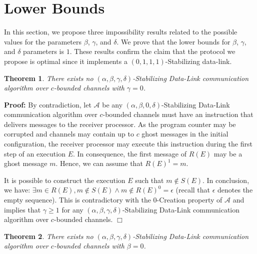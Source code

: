 \documentclass[11pt]{article}
\newtheorem{theorem}{Theorem}
\newenvironment{proof}{\noindent\textbf{Proof:}}{\hfill$\Box$}
\begin{document}
\section{Lower Bounds}\label{sec:impossibility}

In this section, we propose three impossibility results related to the possible values for the parameters $\beta$, $\gamma$, and $\delta$. We prove that the lower bounds for $\beta$, $\gamma$, and $\delta$ parameters is $1$. These results confirm the claim that the protocol we propose is optimal since it implements a $(0,1,1,1)$-Stabilizing data-link.

\begin{theorem}\label{th:impGamma}
There exists no $(\alpha,\beta,\gamma,\delta)$-Stabilizing Data-Link communication algorithm over $c$-bounded channels with $\gamma=0$.
\end{theorem}

\begin{proof}
By contradiction, let $\mathcal{A}$ be any $(\alpha,\beta,0,\delta)$-Stabilizing Data-Link communication algorithm over $c$-bounded channels must have an instruction that delivers messages to the receiver processor. As the program counter may be corrupted and channels may contain up to $c$ ghost messages in the initial configuration, the receiver processor may execute this instruction during the first step of an execution $E$. In consequence, the first message of $R(E)$ may be a ghost message $m$. Hence, we can assume that $R(E)^1=m$.

It is possible to construct the execution $E$ such that $m\notin S(E)$. In conclusion, we have: $\exists m\in R(E), m\notin S(E)\wedge m\notin R(E)^0=\epsilon$ (recall that $\epsilon$ denotes the empty sequence). This is contradictory with the 0-Creation property of $\mathcal{A}$ and implies that $\gamma\geq 1$ for any $(\alpha,\beta,\gamma,\delta)$-Stabilizing Data-Link communication algorithm over $c$-bounded channels.
\end{proof}

\begin{theorem}\label{th:impBeta}
There exists no $(\alpha,\beta,\gamma,\delta)$-Stabilizing Data-Link communication algorithm over $c$-bounded channels with $\beta=0$.
\end{theorem}
\end{document}
